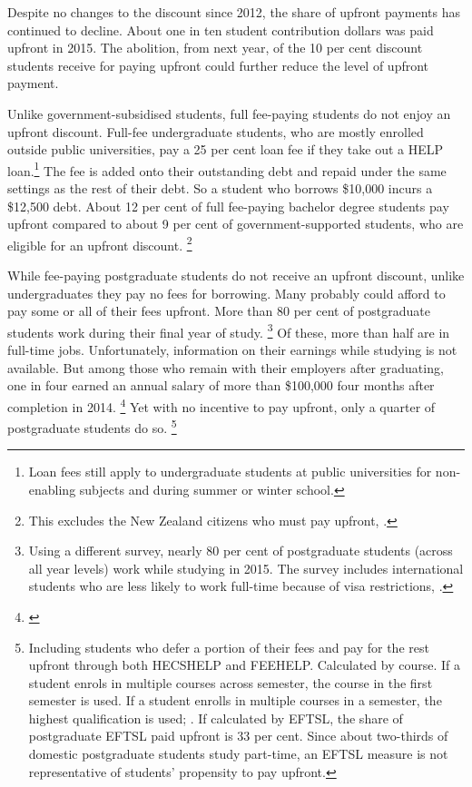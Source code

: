 \documentclass[embargoed]{grattan}
\begin{document}
Despite no changes to the discount since 2012, the share of upfront payments has continued to decline.
About one in ten student contribution dollars was paid upfront in 2015.
The abolition, from next year, of the 10 per cent discount students receive for paying upfront could further reduce the level of upfront payment.

Unlike government-subsidised students, full fee-paying students do not enjoy an upfront discount.
Full-fee undergraduate students, who are mostly enrolled outside public universities, pay a 25 per cent loan fee if they take out a \gls{HELP} loan.\footnote{Loan fees still apply to undergraduate students at public universities for non-enabling subjects and during summer or winter school.} The fee is added onto their outstanding debt and repaid under the same settings as the rest of their debt.
So a student who borrows \$10,000 incurs a \$12,500 debt.
About 12 per cent of full fee-paying bachelor degree students pay upfront compared to about 9 per cent of government-supported students, who are eligible for an upfront discount.%
\footnote{This excludes the New Zealand citizens who must pay upfront, \textcite{EducationvariousyearsStudentsSelectedhigher}.}

While fee-paying postgraduate students do not receive an upfront discount, unlike undergraduates they pay no fees for borrowing.
Many probably could afford to pay some or all of their fees upfront.
More than 80 per cent of postgraduate students work during their final year of study.%
\footnote{Using a different survey, nearly 80 per cent of postgraduate students (across all year levels) work while studying in 2015.
The survey includes international students who are less likely to work full-time because of visa restrictions, \textcite{ABS2016MicrodataEducationwork}.} Of these, more than half are in full-time jobs.
Unfortunately, information on their earnings while studying is not available.
But among those who remain with their employers after graduating, one in four earned an annual salary of more than \$100,000 four months after completion in 2014.%
\footnote{\textcite{GCA2015AustralianGraduateSurvey}} Yet with no incentive to pay upfront, only a quarter of postgraduate students do so.%
\footnote{Including students who defer a portion of their fees and pay for the rest upfront through both \gls{HECSHELP} and \gls{FEEHELP}.
Calculated by course.
If a student enrols in multiple courses across semester, the course in the first semester is used.
If a student enrolls in multiple courses in a semester, the highest qualification is used; \textcite{EducationvariousyearsHigherEducationStatistics}.
If calculated by \gls{EFTSL}, the share of postgraduate \gls{EFTSL} paid upfront is 33 per cent.
Since about two-thirds of domestic postgraduate students study part-time, an \gls{EFTSL} measure is not representative of students' propensity to pay upfront.}
\end{document}
